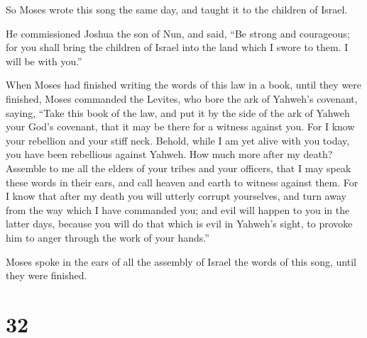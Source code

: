  So Moses wrote this song the same day, and taught it to
the children of Israel.

 He commissioned Joshua the son of Nun, and said, ``Be
strong and courageous; for you shall bring the children of Israel into
the land which I swore to them. I will be with you.''

 When Moses had finished writing the words of this law in
a book, until they were finished,  Moses commanded the
Levites, who bore the ark of Yahweh's covenant, saying, 
``Take this book of the law, and put it by the side of the ark of Yahweh
your God's covenant, that it may be there for a witness against you.
 For I know your rebellion and your stiff neck. Behold,
while I am yet alive with you today, you have been rebellious against
Yahweh. How much more after my death?  Assemble to me all
the elders of your tribes and your officers, that I may speak these
words in their ears, and call heaven and earth to witness against them.
 For I know that after my death you will utterly corrupt
yourselves, and turn away from the way which I have commanded you; and
evil will happen to you in the latter days, because you will do that
which is evil in Yahweh's sight, to provoke him to anger through the
work of your hands.''

 Moses spoke in the ears of all the assembly of Israel
the words of this song, until they were finished.

\hypertarget{section-31}{%
\section{32}\label{section-31}}

